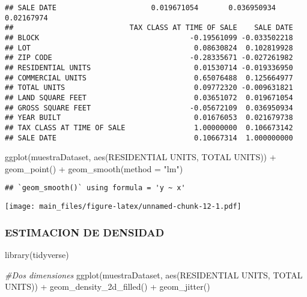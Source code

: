 \documentclass[
]{article}
\newenvironment{Shaded}{\begin{snugshade}}{\end{snugshade}}
\newcommand{\AttributeTok}[1]{\textcolor[rgb]{0.77,0.63,0.00}{#1}}
\newcommand{\CommentTok}[1]{\textcolor[rgb]{0.56,0.35,0.01}{\textit{#1}}}
\newcommand{\FunctionTok}[1]{\textcolor[rgb]{0.00,0.00,0.00}{#1}}
\newcommand{\NormalTok}[1]{#1}
\newcommand{\SpecialCharTok}[1]{\textcolor[rgb]{0.00,0.00,0.00}{#1}}
\newcommand{\StringTok}[1]{\textcolor[rgb]{0.31,0.60,0.02}{#1}}
\begin{document}
\begin{verbatim}
## SALE DATE                      0.019671054       0.036950934  0.02167974
##                           TAX CLASS AT TIME OF SALE    SALE DATE
## BLOCK                                   -0.19561099 -0.033502218
## LOT                                      0.08630824  0.102819928
## ZIP CODE                                -0.28335671 -0.027261982
## RESIDENTIAL UNITS                        0.01530714 -0.019336950
## COMMERCIAL UNITS                         0.65076488  0.125664977
## TOTAL UNITS                              0.09772320 -0.009631821
## LAND SQUARE FEET                         0.03651072  0.019671054
## GROSS SQUARE FEET                       -0.05672109  0.036950934
## YEAR BUILT                               0.01676053  0.021679738
## TAX CLASS AT TIME OF SALE                1.00000000  0.106673142
## SALE DATE                                0.10667314  1.000000000
\end{verbatim}

\begin{Shaded}
\begin{Highlighting}[]
\FunctionTok{ggplot}\NormalTok{(muestraDataset, }\FunctionTok{aes}\NormalTok{(}\StringTok{\textasciigrave{}}\AttributeTok{RESIDENTIAL UNITS}\StringTok{\textasciigrave{}}\NormalTok{, }\StringTok{\textasciigrave{}}\AttributeTok{TOTAL UNITS}\StringTok{\textasciigrave{}}\NormalTok{)) }\SpecialCharTok{+} 
  \FunctionTok{geom\_point}\NormalTok{() }\SpecialCharTok{+}
  \FunctionTok{geom\_smooth}\NormalTok{(}\AttributeTok{method =} \StringTok{"lm"}\NormalTok{)}
\end{Highlighting}
\end{Shaded}

\begin{verbatim}
## `geom_smooth()` using formula = 'y ~ x'
\end{verbatim}

\texttt{[image: main\_files/figure-latex/unnamed-chunk-12-1.pdf]}

\hypertarget{estimacion-de-densidad}{%
\subsubsection{ESTIMACION DE DENSIDAD}\label{estimacion-de-densidad}}

\begin{Shaded}
\begin{Highlighting}[]
\FunctionTok{library}\NormalTok{(tidyverse)}

\CommentTok{\#Dos dimensiones}
\FunctionTok{ggplot}\NormalTok{(muestraDataset, }\FunctionTok{aes}\NormalTok{(}\StringTok{\textasciigrave{}}\AttributeTok{RESIDENTIAL UNITS}\StringTok{\textasciigrave{}}\NormalTok{, }\StringTok{\textasciigrave{}}\AttributeTok{TOTAL UNITS}\StringTok{\textasciigrave{}}\NormalTok{)) }\SpecialCharTok{+}
  \FunctionTok{geom\_density\_2d\_filled}\NormalTok{() }\SpecialCharTok{+}
  \FunctionTok{geom\_jitter}\NormalTok{()}
\end{Highlighting}
\end{Shaded}
\end{document}
